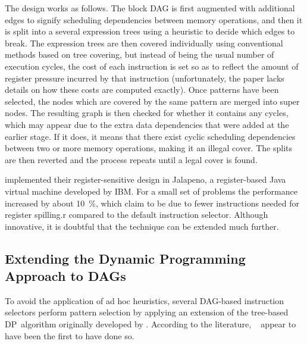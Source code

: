 The design works as follows.
%
The \gls{block DAG} is first augmented with additional \glspl{edge} to signify
scheduling dependencies between memory operations, and then it is split into a
several \glspl{expression tree} using a heuristic to decide which \glspl{edge}
to break.
%
The \glspl{expression tree} are then covered individually using conventional
methods based on \gls{tree covering}, but instead of being the usual number of
execution cycles, the cost of each \gls{instruction} is set so as to reflect the
amount of \gls{register pressure} incurred by that instruction (unfortunately,
the paper lacks details on how these costs are computed exactly).
%
Once \glspl{pattern} have been selected, the \glspl{node} which are covered by
the same \gls{pattern} are merged into \glspl{super node}.
%
The resulting \gls{graph} is then checked for whether it contains any
\glspl{cycle}, which may appear due to the extra data dependencies that were
added at the earlier stage.
%
If it does, it means that there exist cyclic scheduling dependencies between two
or more memory operations, making it an illegal cover.
%
The splits are then reverted and the process repeats until a legal cover is
found.

\citeauthor{SarkarEtAl:2001} implemented their \gls{register}-sensitive design
in \gls{Jalapeno}, a \gls{register}-based \gls{Java} virtual machine developed
by \gls{IBM}.
%
For a small set of problems the performance increased by about
\SI{10}{\percent}, which \citeauthor{SarkarEtAl:2001} claim to be due to fewer
\glspl{instruction} needed for \gls{register} \gls{spilling.r} compared to the
default \gls{instruction selector}.
%
Although innovative, it is doubtful that the technique can be extended much
further.


\subsection{Extending the Dynamic Programming Approach to DAGs}

To avoid the application of ad hoc heuristics, several \gls{DAG}-based
\glspl{instruction selector} perform \gls{pattern selection} by applying an
extension of the \gls{tree}-based \gls{DP}~algorithm originally developed by
\textcite{AhoJohnson:1976}.
%
According to the literature, \citeauthor{LiemEtAl:1994}~\cite{LiemEtAl:1994,
  PaulinEtAl:1994, PaulinEtAl:1995} appear to have been the first to have done
so.

